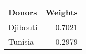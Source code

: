 \begin{tabular}{lr}
\toprule
  Donors &  Weights \\
\midrule
Djibouti &   0.7021 \\
 Tunisia &   0.2979 \\
\bottomrule
\end{tabular}
